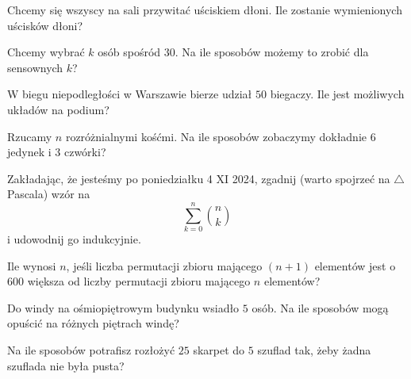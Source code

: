 \documentclass{article}
\begin{document}
\begin{zadanie}
  Chcemy się wszyscy na sali przywitać uściskiem dłoni. Ile zostanie wymienionych uścisków dłoni?
\end{zadanie}

\begin{zadanie}
  Chcemy wybrać $k$ osób spośród $30$. Na ile sposobów możemy to zrobić dla sensownych $k$?
\end{zadanie}

\begin{zadanie}
  W biegu niepodległości w Warszawie bierze udział $50$ biegaczy. Ile jest możliwych układów na podium?
\end{zadanie}

\begin{zadanie}
  Rzucamy $n$ rozróżnialnymi kośćmi. Na ile sposobów zobaczymy dokładnie $6$ jedynek i $3$ czwórki?
\end{zadanie}

\begin{zadanie}
  Zakładając, że jesteśmy po poniedziałku 4 XI 2024, zgadnij (warto spojrzeć na $\triangle$ Pascala) wzór na
  $$\sum_{k=0}^n\binom{n}{k}$$
  i udowodnij go indukcyjnie.
\end{zadanie}



\begin{zadanie}
  Ile wynosi $n$, jeśli liczba permutacji zbioru mającego $(n+1)$ elementów jest o $600$ większa od liczby permutacji zbioru mającego $n$ elementów?
\end{zadanie}

\begin{zadanie}
Do windy na ośmiopiętrowym budynku wsiadło $5$ osób. Na ile sposobów mogą opuścić na różnych piętrach windę?
\end{zadanie}

\begin{zadanie}
  Na ile sposobów potrafisz rozłożyć $25$ skarpet do $5$ szuflad tak, żeby żadna szuflada nie była pusta?
\end{zadanie}
\end{document}
